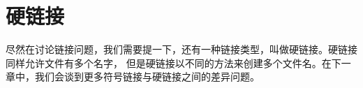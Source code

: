 \section{硬链接} %
\label{sec:硬链接}

尽然在讨论链接问题，我们需要提一下，还有一种链接类型，叫做硬链接。硬链接同样允许文件有多个名字， 但是硬链接以不同的方法来创建多个文件名。在下一章中，我们会谈到更多符号链接与硬链接之间的差异问题。
